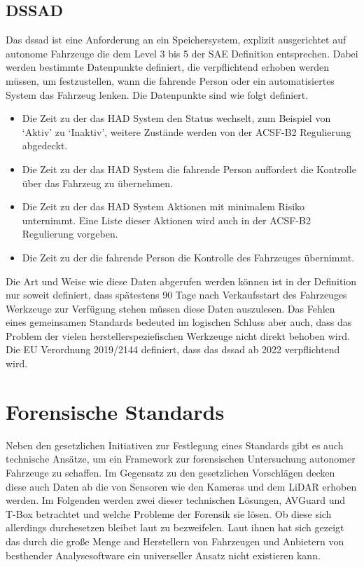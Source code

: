 \documentclass[conference,compsoc,final,a4paper]{IEEEtran}
\begin{document}
\subsection{DSSAD}

Das \ac{dssad} ist eine Anforderung an ein Speichersystem, explizit ausgerichtet auf autonome Fahrzeuge die dem Level 3 bis 5 der \ac{SAE} Definition entsprechen.
Dabei werden bestimmte Datenpunkte definiert, die verpflichtend erhoben werden müssen, um festzustellen, wann die fahrende Person oder ein automatisiertes System das Fahrzeug lenken.
Die Datenpunkte sind wie folgt definiert.
\begin{itemize}
  \item Die Zeit zu der das \ac{HAD} System den Status wechselt, zum Beispiel von `Aktiv' zu `Inaktiv', weitere Zustände werden von der ACSF-B2 Regulierung abgedeckt.
  \item Die Zeit zu der das \ac{HAD} System die fahrende Person auffordert die Kontrolle über das Fahrzeug zu übernehmen.
  \item Die Zeit zu der das \ac{HAD} System Aktionen mit minimalem Risiko unternimmt. Eine Liste dieser Aktionen wird auch in der ACSF-B2 Regulierung vorgeben.
  \item Die Zeit zu der die fahrende Person die Kontrolle des Fahrzeuges übernimmt.
\end{itemize}

Die Art und Weise wie diese Daten abgerufen werden können ist in der Definition nur soweit definiert, dass spätestens 90 Tage nach Verkaufsstart des Fahrzeuges Werkzeuge
zur Verfügung stehen müssen diese Daten auszulesen. Das Fehlen eines gemeinsamen Standards bedeuted im logischen Schluss aber auch, dass das Problem der vielen
herstellerspeziefischen Werkzeuge nicht direkt behoben wird.\\
Die EU Verordnung 2019/2144 definiert, dass das \ac{dssad} ab 2022 verpflichtend wird.

\section{Forensische Standards}

Neben den gesetzlichen Initiativen zur Festlegung eines Standards gibt es auch technische Ansätze, um ein Framework zur forensischen
Untersuchung autonomer Fahrzeuge zu schaffen. Im Gegensatz zu den gesetzlichen Vorschlägen decken diese auch Daten ab die von Sensoren
wie den Kameras und dem \ac{LiDAR} erhoben werden.
Im Folgenden werden zwei dieser technischen Lösungen, AVGuard\cite{Hoque_2021a} und T-Box\cite{Lee_201} betrachtet und welche Probleme der Forensik sie lösen.
Ob diese sich allerdings durchesetzen bleibet laut  zu bezweifelen. Laut ihnen
hat sich gezeigt das durch die große Menge and Herstellern von Fahrzeugen und Anbietern von besthender Analysesoftware
ein universeller Ansatz nicht existieren kann.
\end{document}
